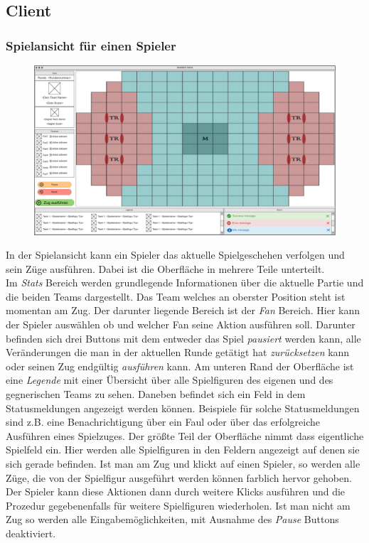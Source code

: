 \subsection{Client}

    \subsubsection{Spielansicht für einen Spieler}

    \begin{figure}[H]
        \centering
        \includegraphics[width=\textwidth]{images/InGamePlayer.PNG}
    \end{figure}

    In der Spielansicht kann ein Spieler das aktuelle Spielgeschehen verfolgen und sein Züge ausführen. Dabei ist die Oberfläche in mehrere Teile unterteilt.\\
    Im \textit{Stats} Bereich werden grundlegende Informationen über die aktuelle Partie und die beiden Teams dargestellt. Das Team welches an oberster Position steht ist momentan am Zug. Der darunter liegende Bereich ist der \textit{Fan} Bereich. Hier kann der Spieler auswählen ob und welcher Fan seine Aktion ausführen soll. Darunter befinden sich drei Buttons mit dem entweder das Spiel \textit{pausiert} werden kann, alle Veränderungen die man in der aktuellen Runde getätigt hat \textit{zurücksetzen} kann oder seinen Zug endgültig \textit{ausführen} kann. Am unteren Rand der Oberfläche ist eine \textit{Legende} mit einer Übersicht über alle Spielfiguren des eigenen und des gegnerischen Teams zu sehen. Daneben befindet sich ein Feld in dem Statusmeldungen angezeigt werden können. Beispiele für solche Statusmeldungen sind z.B. eine Benachrichtigung über ein Faul oder über das erfolgreiche Ausführen eines Spielzuges. Der größte Teil der Oberfläche nimmt dass eigentliche Spielfeld ein. Hier werden alle Spielfiguren in den Feldern angezeigt auf denen sie sich gerade befinden. Ist man am Zug und klickt auf einen Spieler, so werden alle Züge, die von der Spielfigur ausgeführt werden können farblich hervor gehoben. Der Spieler kann diese Aktionen dann durch weitere Klicks ausführen und die Prozedur gegebenenfalls für weitere Spielfiguren wiederholen. Ist man nicht am Zug so werden alle Eingabemöglichkeiten, mit Ausnahme des \textit{Pause} Buttons deaktiviert.
    

